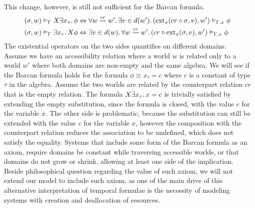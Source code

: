 This change, however, is still not sufficient for the Barcan formula.
\[
  \begin{split}
    ({\sigma}, {w}) \vDash_{\Gamma} {X{\exists {x_\tau} \ldotp {\phi}}}
      &\Leftrightarrow \forall {w \overset{cr}{\rightsquigarrow} w'} \ldotp {\exists {v \in d(w')} \ldotp {({\text{ext}_{x}({cr \circ \sigma},{v})}, {w'}) \vDash_{\Gamma,x} {\phi}}} \\
    ({\sigma}, {w}) \vDash_{\Gamma} {\exists {x_\tau} \ldotp {X{\phi}}}
      &\Leftrightarrow \exists {v \in d(w)} \ldotp {\forall {w \overset{cr}{\rightsquigarrow} w'} \ldotp {({cr \circ \text{ext}_{x}({\sigma},{v})}, {w'}) \vDash_{\Gamma,x} {\phi}}}
  \end{split}
\]
The existential operators on the two sides quantifies on different domains. Assume we have an accessibility relation
where a world $w$ is related only to a world $w'$ where both domains are non-empty and the same algebra.  We will see if
the Barcan formula holds for the formula $\phi \equiv x_\tau = c$ where $c$ is a constant of type $\tau$ in the algebra.
Assume the two worlds are related by the counterpart relation $cr$ that is the empty relation. The formula
$X{\exists {x_\tau} \ldotp {x = c}}$ is trivially satisfied by extending the empty substitution, since the formula is
closed, with the value $c$ for the variable $x$. The other side is problematic, because the substitution can
still be extended with the value $c$ for the variable $x$, however the composition with the counterpart relation reduces
the association to be undefined, which does not satisfy the equality. Systems that include some form of the Barcan
formula as an axiom, require domains be constant while traversing accessible worlds, or that domains do not grow or
shrink, allowing at least one side of the implication. Beside philosophical question regarding the value of such axiom,
we will not extend our model to include such axiom, as one of the main drive of this alternative interpretation of
temporal formulae is the necessity of modeling systems with creation and deallocation of resources.
